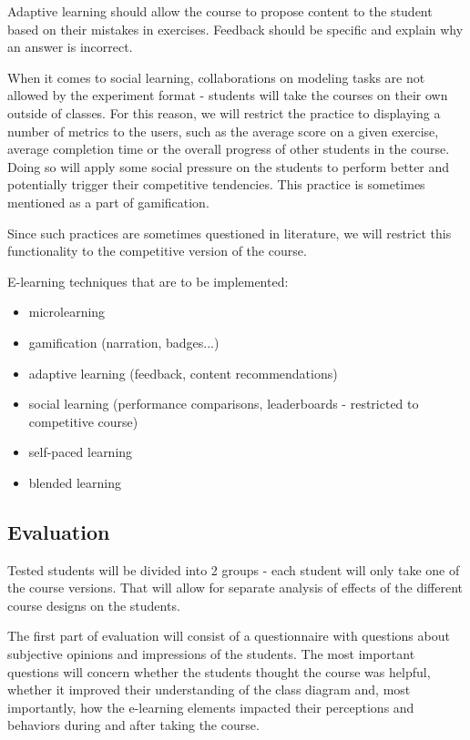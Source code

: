 Adaptive learning should allow the course to propose content to the student based on their mistakes in exercises. Feedback should be specific and explain why an answer is incorrect.

When it comes to social learning, collaborations on modeling tasks are not allowed by the experiment format - students will take the courses on their own outside of classes. For this reason, we will restrict the practice to displaying a number of metrics to the users, such as the average score on a given exercise, average completion time or the overall progress of other students in the course. Doing so will apply some social pressure on the students to perform better and potentially trigger their competitive tendencies. This practice is sometimes mentioned as a part of gamification. 

Since such practices are sometimes questioned in literature, we will restrict this functionality to the competitive version of the course.

E-learning techniques that are to be implemented:

\begin{itemize}
    \item microlearning
    \item gamification (narration, badges...)
    \item adaptive learning (feedback, content recommendations)
    \item social learning (performance comparisons, leaderboards - restricted to competitive course)
    \item self-paced learning
    \item blended learning
\end{itemize}


\subsection{Evaluation}

Tested students will be divided into 2 groups - each student will only take one of the course versions. That will allow for separate analysis of effects of the different course designs on the students.

The first part of evaluation will consist of a questionnaire with questions about subjective opinions and impressions of the students. The most important questions will concern whether the students thought the course was helpful, whether it improved their understanding of the class diagram and, most importantly, how the e-learning elements impacted their perceptions and behaviors during and after taking the course.

